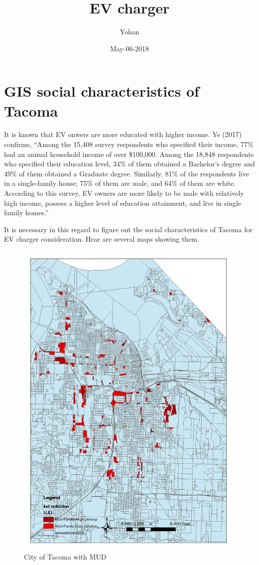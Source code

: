 \documentclass[]{article}
\title{EV charger}
\author{Yohan}
\date{May-06-2018}
\begin{document}
\maketitle

\section{GIS social characteristics of
Tacoma}\label{gis-social-characteristics-of-tacoma}

It is known that EV onwers are more educated with higher income. Ye
(2017) confirms, ``Among the 15,408 survey respondents who specified
their income, 77\% had an annual household income of over \$100,000.
Among the 18,848 respondents who specified their education level, 34\%
of them obtained a Bachelor's degree and 49\% of them obtained a
Graduate degree. Similarly, 81\% of the respondents live in a
single-family house; 75\% of them are male, and 64\% of them are white.
According to this survey, EV owners are more likely to be male with
relatively high income, possess a higher level of education attainment,
and live in single family homes.''

It is necessary in this regard to figure out the social characteristics
of Tacoma for EV charger consideration. Hear are several maps showing
them.

\begin{figure}
\centering
\includegraphics{./figs/map02.jpg}
\caption{City of Tacoma with MUD}
\end{figure}
\end{document}
